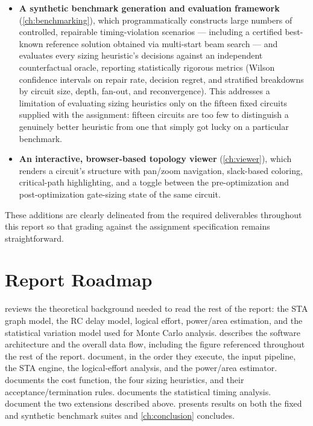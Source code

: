 \begin{itemize}
    \item \textbf{A synthetic benchmark generation and evaluation
          framework} (\cref{ch:benchmarking}), which programmatically
          constructs large numbers of controlled, repairable timing-violation
          scenarios --- including a certified best-known reference solution
          obtained via multi-start beam search --- and evaluates every
          sizing heuristic's decisions against an independent counterfactual
          oracle, reporting statistically rigorous metrics (Wilson
          confidence intervals on repair rate, decision regret, and
          stratified breakdowns by circuit size, depth, fan-out, and
          reconvergence). This addresses a limitation of evaluating sizing
          heuristics only on the fifteen fixed circuits supplied with the
          assignment: fifteen circuits are too few to distinguish a
          genuinely better heuristic from one that simply got lucky on a
          particular benchmark.
    \item \textbf{An interactive, browser-based topology viewer}
          (\cref{ch:viewer}), which renders a circuit's structure with
          pan/zoom navigation, slack-based coloring, critical-path
          highlighting, and a toggle between the pre-optimization and
          post-optimization gate-sizing state of the same circuit.
\end{itemize}

These additions are clearly delineated from the required deliverables
throughout this report so that grading against the assignment specification
remains straightforward.

\section{Report Roadmap}
\label{sec:intro-roadmap}

 reviews the theoretical background needed to read the
rest of the report: the STA graph model, the RC delay model, logical effort,
power/area estimation, and the statistical variation model used for Monte
Carlo analysis.  describes the software architecture
and the overall data flow, including the figure referenced throughout the
rest of the report. 
document, in the order they execute, the input pipeline, the STA engine, the
logical-effort analysis, and the power/area estimator.
 documents the cost function, the four sizing
heuristics, and their acceptance/termination rules. 
documents the statistical timing analysis. 
document the two extensions described above.  presents
results on both the fixed and synthetic benchmark suites and \cref{ch:conclusion} concludes.
